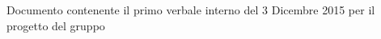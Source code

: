 Documento contenente il primo verbale interno del 3 Dicembre 2015 per il progetto \progetto{} del gruppo \gruppo
